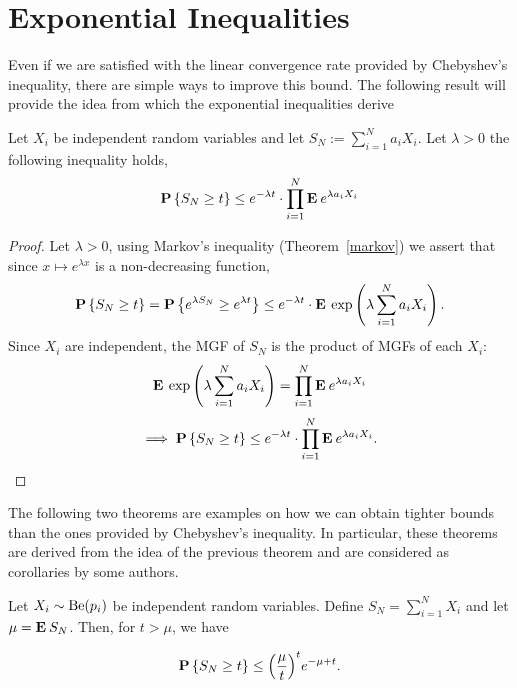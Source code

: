 \chapter{Exponential Inequalities}

Even if we are satisfied with the linear convergence rate provided by Chebyshev's inequality, there are simple ways to improve this bound. The following result will provide the idea from which the exponential inequalities derive

\begin{theorem}\label{mgf}
  Let $X_i$ be independent random variables and let $S_N := \sum_{i = 1}^N a_i X_i$. Let $\lambda > 0$ the following inequality holds,
  \[ \P\left\{  S_N \geq t\right\} \leq e^{-\lambda t}\cdot \prod_{i = 1}^N \E e^{\lambda a_i X_i} \] 

\end{theorem}

\begin{proof}
  Let $\lambda > 0$, using Markov's inequality (Theorem~\ref{markov}) we assert that since $x\mapsto e^{\lambda x}$ is a non-decreasing function,
  \[ \P\left\{  S_N \geq t\right\} = \P\left\{  e^{\lambda S_N} \geq e^{\lambda t}\right\} \leq e^{-\lambda t} \cdot \E \exp\left( \lambda \sum_{i = 1}^N a_i X_i \right). \]
  Since $X_i$ are independent, the MGF of $S_N$ is the product of MGFs of each $X_i$:
  \[\E \exp\left( \lambda \sum_{i = 1}^N a_i X_i \right) = \prod_{i = 1}^N \E e^{\lambda a_i X_i} \] 
  \[ \implies \P\left\{  S_N \geq t\right\} \leq e^{-\lambda t}\cdot \prod_{i = 1}^N \E e^{\lambda a_i X_i}. \]
\end{proof}

The following two theorems are examples on how we can obtain tighter bounds than the ones provided by Chebyshev's inequality. In particular, these theorems are derived from the idea of the previous theorem and are considered as corollaries by some authors.

\begin{theorem}\label{chernoff:bernoulli}
  Let $X_i \sim \Be(p_i)$ be independent random variables. Define $S_N = \sum_{i = 1}^{N} X_i$ and let $\mu = \E S_N$. Then, for $t > \mu$, we have
  
  \[ \P\left\{  S_N \geq t\right\} \leq  {\left(\frac{\mu}{t}\right)}^t e^{-\mu+t} .\] 
\end{theorem}


